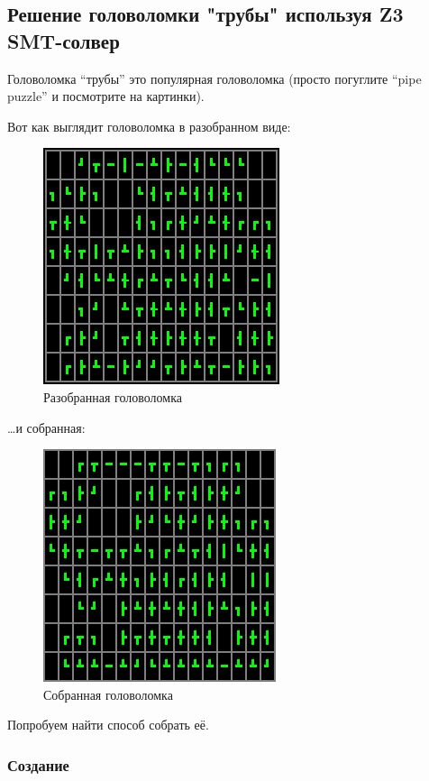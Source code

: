 \subsection{Решение головоломки "трубы" используя Z3 SMT-солвер}

Головоломка ``трубы'' это популярная головоломка (просто погуглите ``pipe puzzle'' и посмотрите на картинки).

Вот как выглядит головоломка в разобранном виде:

\begin{figure}[H]
\label{fig:pipe_shuffled}
\centering
\includegraphics[scale=0.75]{SMT/pipe/shuffled.png}
\caption{Разобранная головоломка}
\end{figure}

\dots и собранная:

\begin{figure}[H]
\label{fig:pipe_solved}
\centering
\includegraphics[scale=0.75]{SMT/pipe/solved.png}
\caption{Собранная головоломка}
\end{figure}

Попробуем найти способ собрать её.

\subsubsection{Создание}

